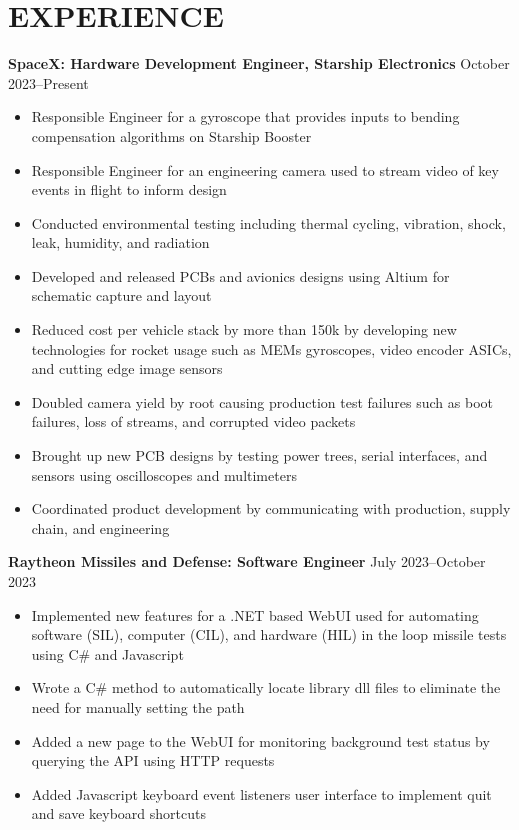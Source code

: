 \documentclass{article}
\begin{document}
\section{EXPERIENCE}
\textbf{SpaceX: Hardware Development Engineer, Starship Electronics}
\hfill
\vspace{0.5em}
October 2023--Present
\begin{itemize}
\item{ Responsible Engineer for a gyroscope that provides inputs to bending compensation algorithms on Starship Booster }
\item{ Responsible Engineer for an engineering camera used to stream video of key events in flight to inform design }
\item{ Conducted environmental testing including thermal cycling, vibration, shock, leak, humidity, and radiation }
\item{ Developed and released PCBs and avionics designs using Altium for schematic capture and layout}
\item{ Reduced cost per vehicle stack by more than 150k by developing new technologies for rocket usage such as MEMs gyroscopes, video encoder ASICs, and cutting edge image sensors }
\item{ Doubled camera yield by root causing production test failures such as boot failures, loss of streams, and corrupted video packets}
\item{ Brought up new PCB designs by testing power trees, serial interfaces, and sensors using oscilloscopes and multimeters }
\item{ Coordinated product development by communicating with production, supply chain, and engineering }
\end{itemize}
\vspace{1em}
\textbf{Raytheon Missiles and Defense: Software Engineer}
\hfill
\vspace{0.5em}
July 2023--October 2023
\begin{itemize}
\item{Implemented new features for a .NET based WebUI used for automating software (SIL), computer (CIL), and hardware (HIL) in the loop missile tests using C\# and Javascript}
\item{Wrote a C\# method to automatically locate library dll files to eliminate the need for manually setting the path}
\item{Added a new page to the WebUI for monitoring background test status by querying the API using HTTP requests}
\item{Added Javascript keyboard event listeners user interface to implement quit and save keyboard shortcuts}
\end{itemize}
\end{document}
